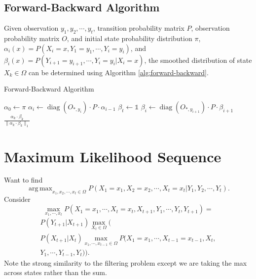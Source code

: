 \documentclass{article}
\DeclareMathOperator*{\argmax}{arg\,max}
\DeclareMathOperator{\diag}{diag}
\begin{document}
\subsection{Forward-Backward Algorithm}
Given observation $y_1, y_2, \cdots, y_t$, transition probability matrix $P$, observation probability matrix $O$, and initial state probability distribution $\pi$, $\alpha_i(x) = P(X_i = x , Y_1 = y_1, \cdots, Y_i = y_i)$, and $\beta_i(x) = P(Y_{i+1} = y_{i+1}, \cdots, Y_i = y_i | X_i = x)$, the smoothed distribution of state $X_k \in \Omega$ can be determined using Algorithm \ref{alg:forward-backward}.
\begin{algorithm}
\caption{Forward-Backward Algorithm}
\label{alg:forward-backward}
\begin{algorithmic}
\STATE $\alpha_0 \leftarrow \pi$
\STATE $\alpha_i \leftarrow \diag(O_{*,y_i}) \cdot P \cdot \alpha_{i-1}$
\ENDFOR
\STATE $\beta_t \leftarrow \mathds{1}$
\STATE $\beta_i \leftarrow \diag(O_{*,y_{i+1}}) \cdot P \cdot \beta_{i+1}$
\ENDFOR
\RETURN $\frac{\alpha_k \cdot \beta_k}{\|\alpha_k \cdot \beta_k\|_1}$
\end{algorithmic}
\end{algorithm}

\section{Maximum Likelihood Sequence}
Want to find 
\begin{equation}
\argmax_{x_1, x_2, \cdots, x_t \in \Omega} P(X_1 = x_1, X_2 = x_2, \cdots, X_t = x_t | Y_1, Y_2, \cdots, Y_t).
\end{equation}
Consider
\begin{equation}
\max_{x_1, \cdots, x_t} P(X_1 = x_1, \cdots, X_t = x_t, X_{t+1}, Y_1, \cdots, Y_t, Y_{t+1}) =
\end{equation}
\begin{multline}
P(Y_{t+1} | X_{t+1}) \max_{X_t \in \Omega}(\\
P(X_{t+1} | X_t) \max_{x_1, \cdots, x_{t-1} \in \Omega}P(X_1 = x_1, \cdots, X_{t-1} = x_{t-1}, X_t, \\
Y_1, \cdots, Y_{t-1}, Y_t)).
\end{multline}
Note the strong similarity to the filtering problem except we are taking the max across states rather than the sum.
\end{document}
